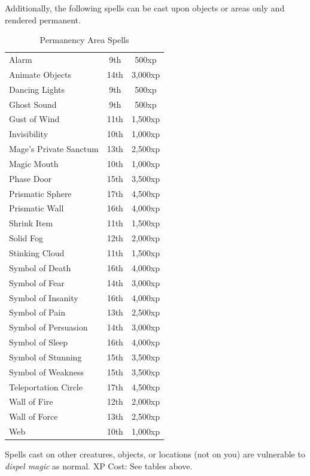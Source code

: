 Additionally, the following spells can be cast upon objects or areas only and rendered
permanent.
\begin{table}[htb]
\caption{Permanency Area Spells}
\centering
\begin{tabular}{l c c}
Alarm & 9th & 500xp\\
Animate Objects & 14th & 3,000xp\\
Dancing Lights & 9th & 500xp\\
Ghost Sound & 9th & 500xp\\
Gust of Wind & 11th & 1,500xp\\
Invisibility & 10th & 1,000xp\\
Mage's Private Sanctum & 13th & 2,500xp\\
Magic Mouth & 10th & 1,000xp\\
Phase Door & 15th & 3,500xp\\
Prismatic Sphere & 17th & 4,500xp\\
Prismatic Wall & 16th & 4,000xp\\
Shrink Item & 11th & 1,500xp\\
Solid Fog & 12th & 2,000xp\\
Stinking Cloud & 11th & 1,500xp\\
Symbol of Death & 16th & 4,000xp\\
Symbol of Fear & 14th & 3,000xp\\
Symbol of Insanity & 16th & 4,000xp\\
Symbol of Pain & 13th & 2,500xp\\
Symbol of Persuasion & 14th & 3,000xp\\
Symbol of Sleep & 16th & 4,000xp\\
Symbol of Stunning & 15th & 3,500xp\\
Symbol of Weakness & 15th & 3,500xp\\
Teleportation Circle & 17th & 4,500xp\\
Wall of Fire & 12th & 2,000xp\\
Wall of Force & 13th & 2,500xp\\
Web & 10th & 1,000xp\\
\end{tabular}
\end{table}
Spells cast on other creatures, objects, or locations (not on you) are vulnerable
to \textit{dispel magic} as normal.
XP Cost: See tables above.